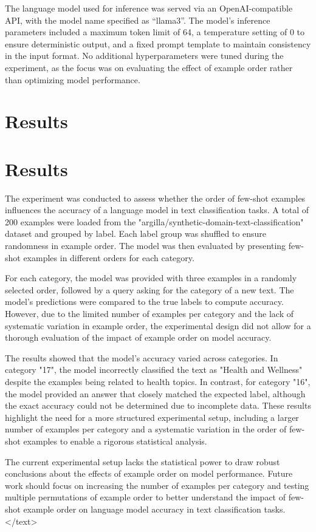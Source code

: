 \documentclass{article}
\begin{document}
The language model used for inference was served via an OpenAI-compatible API, with the model name specified as ``llama3''. The model's inference parameters included a maximum token limit of 64, a temperature setting of 0 to ensure deterministic output, and a fixed prompt template to maintain consistency in the input format. No additional hyperparameters were tuned during the experiment, as the focus was on evaluating the effect of example order rather than optimizing model performance.
\section{Results}
\section{Results}

The experiment was conducted to assess whether the order of few-shot examples influences the accuracy of a language model in text classification tasks. A total of 200 examples were loaded from the "argilla/synthetic-domain-text-classification" dataset and grouped by label. Each label group was shuffled to ensure randomness in example order. The model was then evaluated by presenting few-shot examples in different orders for each category.

For each category, the model was provided with three examples in a randomly selected order, followed by a query asking for the category of a new text. The model's predictions were compared to the true labels to compute accuracy. However, due to the limited number of examples per category and the lack of systematic variation in example order, the experimental design did not allow for a thorough evaluation of the impact of example order on model accuracy.

The results showed that the model's accuracy varied across categories. In category "17", the model incorrectly classified the text as "Health and Wellness" despite the examples being related to health topics. In contrast, for category "16", the model provided an answer that closely matched the expected label, although the exact accuracy could not be determined due to incomplete data. These results highlight the need for a more structured experimental setup, including a larger number of examples per category and a systematic variation in the order of few-shot examples to enable a rigorous statistical analysis.

The current experimental setup lacks the statistical power to draw robust conclusions about the effects of example order on model performance. Future work should focus on increasing the number of examples per category and testing multiple permutations of example order to better understand the impact of few-shot example order on language model accuracy in text classification tasks.
</text>
\end{document}
